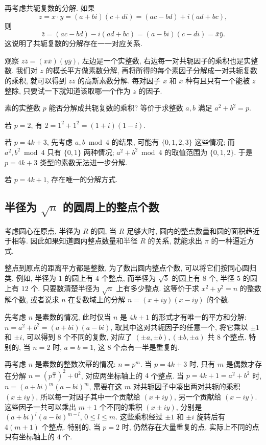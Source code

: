 再考虑共轭复数的分解. 如果 
$$ z = x\cdot y = (a+bi)(c+di) = (ac-bd)+i(ad+bc), $$ 则 $$ \bar{z} = (ac-bd)-i(ad+bc) = (a-bi)(c-di) = \bar{x}\bar{y}. $$ 这说明了共轭复数的分解存在一一对应关系.

观察 $ z\bar{z}= (x\bar{x})(y\bar{y}) $, 左边是一个实整数, 右边每一对共轭因子的乘积也是实整数. 我们对 $ z $ 的模长平方做素数分解, 再将所得的每个素因子分解成一对共轭复数的乘积, 就可以得到 $ z\bar{z} $ 的高斯素数分解. 每对因子 $ x $ 和 $ \bar{x} $ 种有且只有一个能被 $ z $ 整除, 只要试一下就知道该取哪一个作为 $ z $ 的因子.

素的实整数 $ p $ 能否分解成共轭复数的乘积? 等价于求整数 $ a, b $ 满足 $ a^2 + b^2 = p $.

若 $ p = 2 $, 有 $ 2 = 1^2 + 1^2 = (1+i)(1-i) $.

若 $ p = 4k + 3 $, 先考虑 $ a, b \bmod{4} $ 的结果, 可能有 $\{0, 1, 2, 3\} $ 这些情况; 而 $ a^2, b^2 \bmod{4} $ 只有 $ \{0, 1\} $ 两种情况; $ a^2 + b^2 \bmod{4} $ 的取值范围为 $ \{0,1,2\} $. 于是 $ p = 4k + 3 $ 类型的素数无法进一步分解.

若 $ p = 4k + 1$, 存在唯一的分解方式.

\subsection{半径为 \texorpdfstring{$ \sqrt{n} $}{sqrtn} 的圆周上的整点个数}

考虑圆心在原点, 半径为 $ R $ 的圆, 当 $ R $ 足够大时, 圆内的整点数量和圆的面积趋近于相等. 因此如果知道圆内整点数量和半径 $ R $ 的关系, 就能求出 $ \pi $ 的一种逼近方式.

整点到原点的距离平方都是整数, 为了数出圆内整点个数, 可以将它们按同心圆归类. 例如, 半径为 $ 1 $ 的圆上有 $ 4 $ 个整点, 而半径为 $ \sqrt{5} $ 的圆上有 $ 8 $ 个, 半径 $ 5 $ 的圆上有 $ 12 $ 个. 只要数清楚半径为 $ \sqrt{n} $ 上有多少整点. 这等价于求 $ x^2+y^2 = n $ 的整数解个数, 或者说求 $ n $ 在复数域上的分解 $ n = (x+iy)(x-iy) $ 的个数.

先考虑 $ n $ 是素数的情况, 此时仅当 $ n $ 是 $ 4k + 1 $ 的形式才有唯一的平方和分解: $ n = a^2 + b^2 = (a+bi)(a-bi) $, 取其中这对共轭因子的任意一个, 将它乘以 $ \pm 1 $ 和 $ \pm i $, 可以得到 8 个不同的复数, 对应了 $ (\pm a, \pm b), (\pm b, \pm a) $ 共 $8$ 个整点. 特别的, 当 $ n = 2 $ 时, $ a = b = 1 $, 这 $8$ 个点有一半是重复的.

再考虑 $ n $ 是素数的整数次幂的情况: $ n = p^m $. 当 $ p = 4k + 3 $ 时, 只有 $ m $ 是偶数才存在分解 $ n = (p^\frac{m}{2})^2 + 0^2 $, 对应两坐标轴上的 $4$ 个整点. 当 $ p = 4k + 1 = a^2+b^2 $ 时, $ n = (a+bi)^m(a-bi)^m $, 需要在这 $ m $ 对共轭因子中凑出两对共轭的乘积 $ (x\pm iy) $, 所以每一对因子其中一个贡献给 $(x+iy)$, 另一个贡献给 $(x-iy)$. 这些因子一共可以乘出 $m+1$ 个不同的乘积 $ (x\pm iy) $, 分别是 $(a+bi)^l(a-bi)^{m-l} $, $ 0 \le l \le m $. 这些乘积经过 $ \pm 1 $ 和 $ \pm i $ 旋转后有 $ 4(m+1) $ 个整点. 特别的, 当 $ p = 2 $ 时, 仍然存在大量重复的点, 实际上不同的点只有坐标轴上的 $4$ 个.

